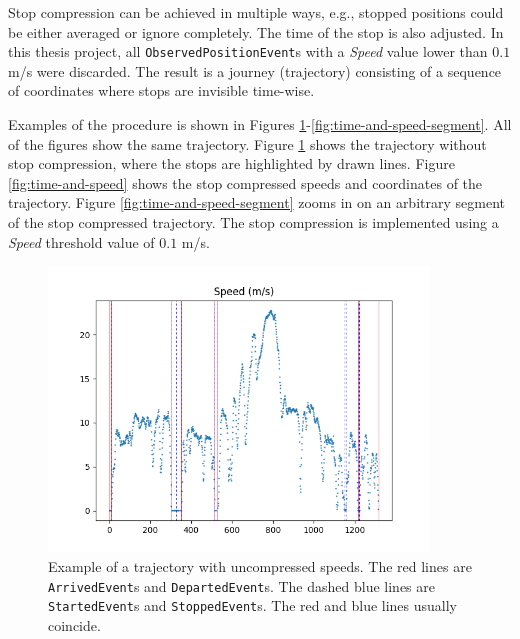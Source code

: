 Stop compression can be achieved in multiple ways, e.g., stopped positions could be either averaged or ignore completely.
The time of the stop is also adjusted.
In this thesis project, all \texttt{ObservedPositionEvent}s with a \textit{Speed} value lower than $0.1$ m/s were discarded.
The result is a journey (trajectory) consisting of a sequence of coordinates where stops are invisible time-wise.

Examples of the procedure is shown in Figures \ref{fig:uncompressed-events}-\ref{fig:time-and-speed-segment}.
All of the figures show the same trajectory.
Figure \ref{fig:uncompressed-events} shows the trajectory without stop compression, where the stops are highlighted by drawn lines.
Figure \ref{fig:time-and-speed} shows the stop compressed speeds and coordinates of the trajectory.
Figure \ref{fig:time-and-speed-segment} zooms in on an arbitrary segment of the stop compressed trajectory.
The stop compression is implemented using a \textit{Speed} threshold value of $0.1$ m/s.

\begin{figure}[h!]
    \centering
    \includegraphics[width=0.9\textwidth]{figures/speed_and_stops_filter_0}
    \caption[Example of a trajectory with uncompressed speeds]
    {\small Example of a trajectory with uncompressed speeds.
    The red lines are \texttt{ArrivedEvent}s and \texttt{DepartedEvent}s.
    The dashed blue lines are \texttt{StartedEvent}s and \texttt{StoppedEvent}s.
    The red and blue lines usually coincide.}
    \label{fig:uncompressed-events}
\end{figure}

